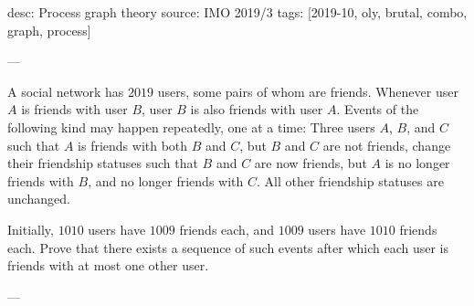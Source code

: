 desc: Process graph theory
source: IMO 2019/3
tags: [2019-10, oly, brutal, combo, graph, process]

---

A social network has $2019$ users, some pairs of whom are friends. Whenever user $A$ is friends with user $B$, user $B$ is also friends with user $A$. Events of the following kind may happen repeatedly, one at a time: Three users $A$, $B$, and $C$ such that $A$ is friends with both $B$ and $C$, but $B$ and $C$ are not friends, change their friendship statuses such that $B$ and $C$ are now friends, but $A$ is no longer friends with $B$, and no longer friends with $C$. All other friendship statuses are unchanged.

Initially, $1010$ users have $1009$ friends each, and $1009$ users have $1010$ friends each. Prove that there exists a sequence of such events after which each user is friends with at most one other user.

---

